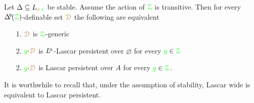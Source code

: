 \begin{theorem}\label{thm_Ggeneric_persistent}
  Let $\Delta\subseteq L_{{\color{brown} x}\,{\color{green} z}}$ be stable.
  Assume the action of ${\color{green}\EuScript Z}$ is transitive.
  Then for every $\BDelta(\grZ)$-definable set ${\color{brown}\EuScript D}$ the following are equivalent
  \begin{itemize}
    \item [1.] ${\color{brown}\EuScript D}$ is ${\color{green}\EuScript Z}$-generic
    \item [2.] ${\color{green} g}{\cdot}{\color{brown}\EuScript D}$ is $L\kern-.5ex^{\scriptscriptstyle\Delta}$-Lascar persistent over $\varnothing$ for every ${\color{green} g}\in{\color{green}\EuScript Z}$
    \item [2.] ${\color{green} g}{\cdot}{\color{brown}\EuScript D}$ is Lascar persistent over $A$ for every ${\color{green} g}\in{\color{green}\EuScript Z}$.
  \end{itemize}
\end{theorem}

It is worthwhile to recall that, under the assumption of stability, Lascar wide is equivalent to Lascar persistent.


